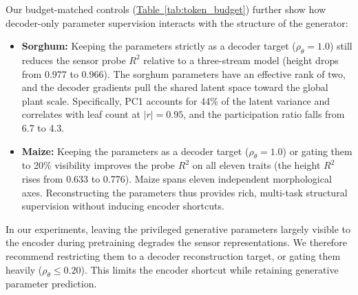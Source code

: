 \documentclass[10pt,twocolumn,letterpaper]{article}
\newcommand{\tabref}[1]{\hyperref[#1]{Table~\ref*{#1}}}
\begin{document}
Our budget-matched controls (\tabref{tab:token_budget}) further show how decoder-only parameter supervision interacts with the structure of the generator:
\begin{itemize}
  \item \textbf{Sorghum:} Keeping the parameters strictly as a decoder target ($\rho_\theta = 1.0$) still reduces the sensor probe $R^2$ relative to a three-stream model (height drops from 0.977 to 0.966). The sorghum parameters have an effective rank of two, and the decoder gradients pull the shared latent space toward the global plant scale. Specifically, PC1 accounts for 44\% of the latent variance and correlates with leaf count at $|r| = 0.95$, and the participation ratio falls from 6.7 to 4.3.
  \item \textbf{Maize:} Keeping the parameters as a decoder target ($\rho_\theta = 1.0$) or gating them to 20\% visibility improves the probe $R^2$ on all eleven traits (the height $R^2$ rises from 0.633 to 0.776). Maize spans eleven independent morphological axes. Reconstructing the parameters thus provides rich, multi-task structural supervision without inducing encoder shortcuts.
\end{itemize}
In our experiments, leaving the privileged generative parameters largely visible to the encoder during pretraining degrades the sensor representations. We therefore recommend restricting them to a decoder reconstruction target, or gating them heavily ($\rho_\theta \le 0.20$). This limits the encoder shortcut while retaining generative parameter prediction.
\end{document}
